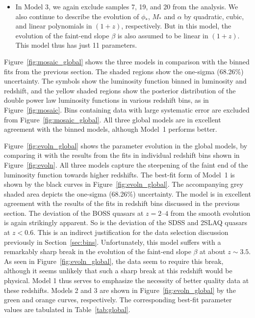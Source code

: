 \documentclass[fleqn,usenatbib]{mnras}
\begin{document}
\begin{itemize}
      \item In Model 3, we again exclude samples 7, 19, and 20 from the
        analysis.  We also continue to describe the evolution of $\phi_*$,
        $M_*$ and $\alpha$ by quadratic, cubic, and linear polynomials in
        $(1+z)$, respectively.  But in this model, the evolution of the
        faint-end slope $\beta$ is also assumed to be linear in $(1+z)$.
        This model thus has just 11 parameters.
      \end{itemize}

      Figure~\ref{fig:mosaic_global} shows the three models in comparison
      with the binned fits from the previous section.  The shaded regions
      show the one-sigma (68.26\%) uncertainty.  The symbols show the
      luminosity function binned in luminosity and redshift, and the yellow
      shaded regions show the posterior distribution of the double power law
      luminosity functions in various redshift bins, as in
      Figure~\ref{fig:mosaic}.  Bins containing data with large systematic
      error are excluded from Figure~\ref{fig:mosaic_global}.  All three
      global models are in excellent agreement with the binned models,
      although Model~1 performs better.  

      Figure~\ref{fig:evoln_global} shows the parameter evolution in the
      global models, by comparing it with the results from the fits in
      individual redshift bins shown in Figure~\ref{fig:evoln}.  All three
      models capture the steepening of the faint end of the luminosity
      function towards higher redshifts.  The best-fit form of Model~1 is
      shown by the black curves in Figure~\ref{fig:evoln_global}.  The
      accompanying grey shaded area depicts the one-sigma (68.26\%)
      uncertainty.  The model is in excellent agreement with the results of
      the fits in redshift bins discussed in the previous section.  The
      deviation of the BOSS quasars at $z=2$--$4$ from the smooth evolution
      is again strikingly apparent.  So is the deviation of the SDSS and
      2SLAQ quasars at $z<0.6$.  This is an indirect justification for the
      data selection discussion previously in Section~\ref{sec:bins}.
      Unfortunately, this model suffers with a remarkably sharp break in the
      evolution of the faint-end slope $\beta$ at about $z\sim 3.5$.  As
      seen in Figure~\ref{fig:evoln_global}, the data seem to require this
      break, although it seems unlikely that such a sharp break at this
      redshift would be physical.  Model 1 thus serves to emphasize the
      necessity of better quality data at these redshifts.  Models 2 and 3
      are shown in Figure~\ref{fig:evoln_global} by the green and orange
      curves, respectively.  The corresponding best-fit parameter values are
      tabulated in Table~\ref{tab:global}.
\end{document}
